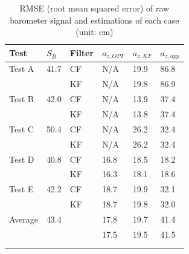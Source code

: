 \documentclass[10pt,journal,compsoc]{IEEEtran}
\begin{document}
\begin{table}[tp]
    \caption{RMSE (root mean squared error) of raw barometer signal and estimations of each case
    (unit: cm)}
\vspace*{-5mm}
\label{table:rmse}
\centering
\begin{tabular}{llllll}
\\ \toprule
\textbf{Test} & $S_B$ & \textbf{Filter} & $a_{z,OPT}$ & $a_{z,KF}$ & $a_{z,app}$ \\ \midrule
Test A & 41.7 & CF & N/A & 19.9 & 86.8\\ \hline &  & KF & N/A & 19.8 & 86.9\\ \hline
Test B & 42.0 & CF & N/A & 13.9 & 37.4\\ \hline &  & KF & N/A & 13.8 & 37.4\\ \hline
Test C & 50.4 & CF & N/A & 26.2 & 32.4\\ \hline &  & KF & N/A & 26.2 & 32.4\\ \hline
Test D & 40.8 & CF & 16.8 & 18.5 & 18.2 \\ \hline &  & KF & 16.3 & 18.1 & 18.6\\ \hline
Test E & 42.2 & CF & 18.7 & 19.9 & 32.1 \\ \hline &  & KF & 18.7 & 19.8 & 32.0\\ \hline
Average & 43.4 & & 17.8 & 19.7 & 41.4 \\ \hline &  & & 17.5 & 19.5 & 41.5\\ \hline
\\
\\
\end{tabular}
\end{table}  


\end{document}
